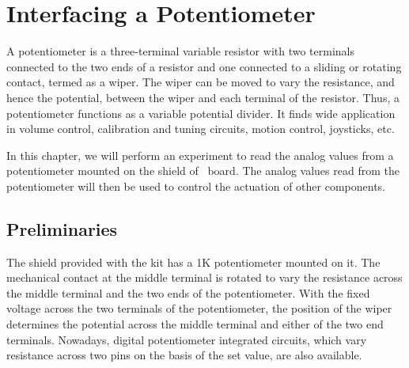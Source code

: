 \chapter{Interfacing a Potentiometer}
\thispagestyle{empty}
\label{potmeter}

\newcommand{\LocPotfig}{\Origin/user-code/pot/figures}
\newcommand{\LocPotscicode}{\Origin/user-code/pot/scilab}
\newcommand{\LocPotscibrief}[1]{{\tt
    \seqsplit{Origin/user-code/pot/scilab/#1}}, 
see \fnrefp{fn:file-loc}}
\newcommand{\LocPotardcode}{\Origin/user-code/pot/arduino}
\newcommand{\LocPotardbrief}[1]{{\tt
    \seqsplit{Origin/user-code/pot/arduino/#1}},
see \fnrefp{fn:file-loc}}

\newcommand{\LocPotpycode}{\Origin/user-code/pot/python}
\newcommand{\LocPotpybrief}[1]{{\tt
    \seqsplit{Origin/user-code/pot/python/#1}},
see \fnrefp{fn:file-loc}}

\newcommand{\LocPotjuliacode}{\Origin/user-code/pot/julia}
\newcommand{\LocPotjuliabrief}[1]{{\tt
    \seqsplit{Origin/user-code/pot/julia/#1}},
see \fnrefp{fn:file-loc}}

\newcommand{\LocPotOpenModelicacode}{\Origin/user-code/pot/OpenModelica}
\newcommand{\LocPotOpenModelicabrief}[1]{{\tt
    \seqsplit{Origin/user-code/pot/OpenModelica/#1}},
see \fnrefp{fn:file-loc}}

A potentiometer is a three-terminal variable resistor with two
terminals connected to the two ends of a resistor and one connected to
a sliding or rotating contact, termed as a wiper. The wiper can be
moved to vary the resistance, and hence the potential, between the
wiper and each terminal of the resistor. Thus, a potentiometer
functions as a variable potential divider. It finds wide application
in volume control, calibration and tuning circuits, motion control,
joysticks, etc.

In this chapter, we will perform an experiment to read the analog
values from a potentiometer mounted on the shield of \arduino\
board. The analog values read from the potentiometer will then be
used to control the actuation of other components.

\section{Preliminaries}
The shield provided with the kit has a 1K potentiometer mounted on it. The mechanical contact at the middle terminal is rotated to vary the resistance across the middle terminal and the two ends of the potentiometer. With the fixed voltage across the two terminals of the potentiometer, the position of the wiper
determines the potential across the middle terminal and either of the two end terminals. Nowadays, digital potentiometer integrated circuits, which vary resistance across two pins on the basis of the set value, are also available.

